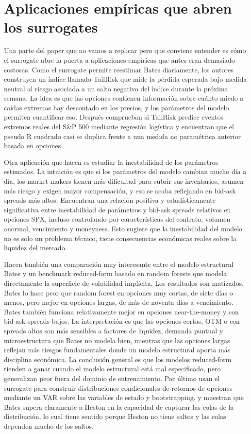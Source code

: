 \documentclass[11pt,a4paper]{article}
\begin{document}
\section*{Aplicaciones empíricas que abren los surrogates}

Una parte del paper que no vamos a replicar pero que conviene entender es cómo el surrogate abre la puerta a aplicaciones empíricas que antes eran demasiado costosas. Como el surrogate permite reestimar Bates diariamente, los autores construyen un índice llamado TailRisk que mide la pérdida esperada bajo medida neutral al riesgo asociada a un salto negativo del índice durante la próxima semana. La idea es que las opciones contienen información sobre cuánto miedo a caídas extremas hay descontado en los precios, y los parámetros del modelo permiten cuantificar eso. Después comprueban si TailRisk predice eventos extremos reales del S\&P 500 mediante regresión logística y encuentran que el pseudo R cuadrado casi se duplica frente a una medida no paramétrica anterior basada en opciones.

Otra aplicación que hacen es estudiar la inestabilidad de los parámetros estimados. La intuición es que si los parámetros del modelo cambian mucho día a día, los market makers tienen más dificultad para cubrir sus inventarios, asumen más riesgo y exigen mayor compensación, y eso se acaba reflejando en bid-ask spreads más altos. Encuentran una relación positiva y estadísticamente significativa entre inestabilidad de parámetros y bid-ask spreads relativos en opciones SPX, incluso controlando por características del contrato, volumen anormal, vencimiento y moneyness. Esto sugiere que la inestabilidad del modelo no es solo un problema técnico, tiene consecuencias económicas reales sobre la liquidez del mercado.

Hacen también una comparación muy interesante entre el modelo estructural Bates y un benchmark reduced-form basado en random forests que modela directamente la superficie de volatilidad implícita. Los resultados son matizados. Bates lo hace peor que random forest en opciones muy cortas, de siete días o menos, pero mejor en opciones largas, de más de noventa días a vencimiento. Bates también funciona relativamente mejor en opciones near-the-money y con bid-ask spreads bajos. La interpretación es que las opciones cortas, OTM o con spreads altos son más sensibles a factores de liquidez, demanda puntual y microestructura que Bates no modela bien, mientras que las opciones largas reflejan más riesgos fundamentales donde un modelo estructural aporta más disciplina económica. La conclusión general es que los modelos reduced-form tienden a ganar cuando el modelo estructural está mal especificado, pero generalizan peor fuera del dominio de entrenamiento. Por último usan el surrogate para construir distribuciones condicionales de retornos de opciones mediante un VAR sobre las variables de estado y bootstrapping, y muestran que Bates supera claramente a Heston en la capacidad de capturar las colas de la distribución, lo cual tiene sentido porque Heston no tiene saltos y las colas dependen mucho de los saltos.
\end{document}
